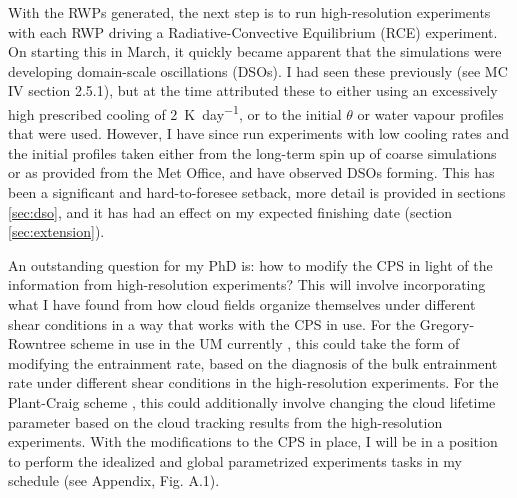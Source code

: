 \documentclass[11pt,a4paper]{article}
\newcommand\todo[1]{\textbf{TODO: #1}}
\begin{document}
With the RWPs generated, the next step is to run high-resolution experiments with each RWP driving a Radiative-Convective Equilibrium (RCE) experiment. On starting this in March, it quickly became apparent that the simulations were developing domain-scale oscillations (DSOs). I had seen these previously (see MC IV section 2.5.1), but at the time attributed these to either using an excessively high prescribed cooling of \SI{2}{K.day^{-1}}, or to the initial $\theta$ or water vapour profiles that were used. However, I have since run experiments with low cooling rates and the initial profiles taken either from the long-term spin up of coarse simulations or as provided from the Met Office, and have observed DSOs forming. This has been a significant and hard-to-foresee setback, more detail is provided in sections \ref{sec:dso}, and it has had an effect on my expected finishing date (section \ref{sec:extension}). %

An outstanding question for my PhD is: how to modify the CPS in light of the information from high-resolution experiments? This will involve incorporating what I have found from how cloud fields organize themselves under different shear conditions in a way that works with the CPS in use. For the Gregory-Rowntree scheme in use in the UM currently \parencite{gregory1990mass}, this could take the form of modifying the entrainment rate, based on the diagnosis of the bulk entrainment rate under different shear conditions in the high-resolution experiments. For the Plant-Craig scheme \parencite{plant2008stochastic}, this could additionally involve changing the cloud lifetime parameter based on the cloud tracking results from the high-resolution experiments. With the modifications to the CPS in place, I will be in a position to perform the idealized and global parametrized experiments tasks in my schedule (see Appendix, Fig. A.1).

\end{document}
